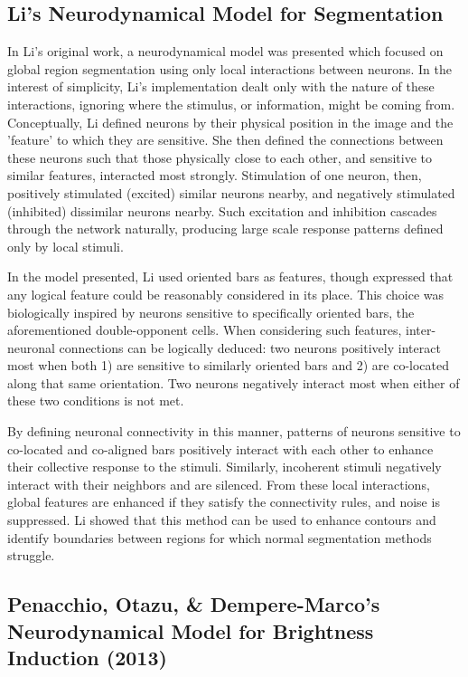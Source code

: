 \documentclass[journal,onecolumn]{IEEEtran}
\begin{document}
\subsection*{Li's Neurodynamical Model for Segmentation \cite{li:1999}}
In Li's original work, a neurodynamical model was presented which focused on global region segmentation using only local interactions between neurons. In the interest of simplicity, Li's implementation dealt only with the nature of these interactions, ignoring where the stimulus, or information, might be coming from. Conceptually, Li defined neurons by their physical position in the image and the 'feature' to which they are sensitive. She then defined the connections between these neurons such that those physically close to each other, and sensitive to similar features, interacted most strongly. Stimulation of one neuron, then, positively stimulated (excited) similar neurons nearby, and negatively stimulated (inhibited) dissimilar neurons nearby. Such excitation and inhibition cascades through the network naturally, producing large scale response patterns defined only by local stimuli.

In the model presented, Li used oriented bars as features, though expressed that any logical feature could be reasonably considered in its place. This choice was biologically inspired by neurons sensitive to specifically oriented bars, the aforementioned double-opponent cells. When considering such features, inter-neuronal connections can be logically deduced: two neurons positively interact most when both 1) are sensitive to similarly oriented bars and 2) are co-located along that same orientation. Two neurons negatively interact most when either of these two conditions is not met.

By defining neuronal connectivity in this manner, patterns of neurons sensitive to co-located and co-aligned bars positively interact with each other to enhance their collective response to the stimuli. Similarly, incoherent stimuli negatively interact with their neighbors and are silenced. From these local interactions, global features are enhanced if they satisfy the connectivity rules, and noise is suppressed. Li showed that this method can be used to enhance contours and identify boundaries between regions for which normal segmentation methods struggle.


\subsection*{Penacchio, Otazu, \& Dempere-Marco's Neurodynamical Model for Brightness Induction (2013)}
\end{document}
